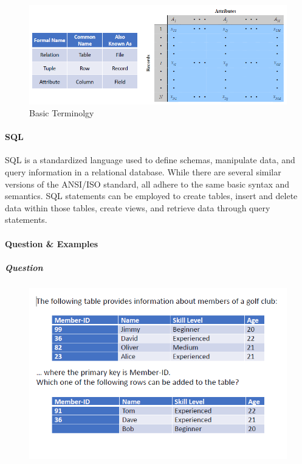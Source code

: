 \documentclass{article}
\begin{document}
                        \begin{figure}[h]
                            \centering
                            \includegraphics[scale=0.5]{../immagini/basic_terminology.png}
                            \caption{Basic Terminolgy}
                        \end{figure}
                    
                    \paragraph{SQL}
                    SQL is a standardized language used to define schemas, manipulate data, and query information in a relational database. While there are several similar versions of the ANSI/ISO standard, all adhere to the same basic syntax and semantics. SQL statements can be employed to create tables, insert and delete data within those tables, create views, and retrieve data through query statements.
            
                    \paragraph{Question \& Examples}
                        \subparagraph{Question}
                        \begin{figure}[h]
                            \centering
                            \includegraphics[scale=0.5]{../immagini/question.png}
                            
                        \end{figure}    
\end{document}
